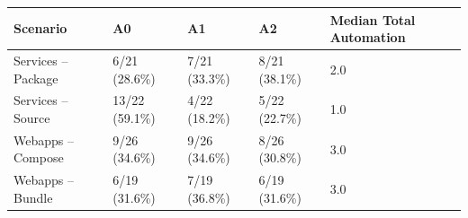 \begin{tabular*}{\tblwidth}{@{} LLLLL@{} }
\toprule
Scenario & A0 & A1 & A2 & Median Total Automation\\
\midrule
Services – Package & 6/21 (28.6\%) & 7/21 (33.3\%) & 8/21 (38.1\%) & 2.0 \\
Services – Source & 13/22 (59.1\%) & 4/22 (18.2\%) & 5/22 (22.7\%) & 1.0 \\
Webapps – Compose & 9/26 (34.6\%) & 9/26 (34.6\%) & 8/26 (30.8\%) & 3.0 \\
Webapps – Bundle & 6/19 (31.6\%) & 7/19 (36.8\%) & 6/19 (31.6\%) & 3.0 \\
\bottomrule
\end{tabular*}